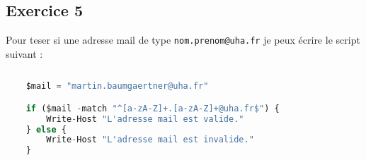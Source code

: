 \documentclass[12pt, a4paper]{article}
\begin{document}
\subsection{Exercice 5}

Pour teser si une adresse mail de type \texttt{nom.prenom@uha.fr} je peux écrire le script suivant :

\begin{lstlisting}[language=Python]
    
    $mail = "martin.baumgaertner@uha.fr"

    if ($mail -match "^[a-zA-Z]+.[a-zA-Z]+@uha.fr$") {
        Write-Host "L'adresse mail est valide."
    } else {
        Write-Host "L'adresse mail est invalide."
    }

\end{lstlisting}
\end{document}
